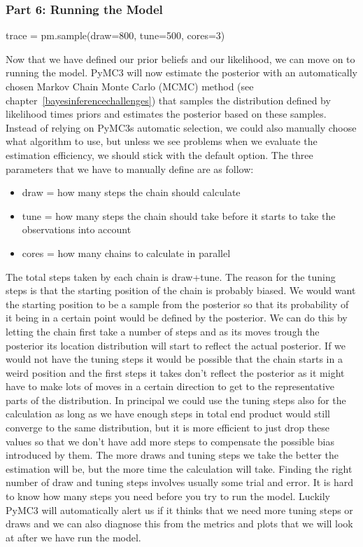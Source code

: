 \documentclass[12pt,a4paper,leqno]{report}
\theoremstyle{plain}
\theoremstyle{definition}
\theoremstyle{remark}
\begin{document}
\subsubsection*{Part 6: Running the Model}

\bigskip
\begin{pyverbatim}[][fontsize=\footnotesize]
    trace = pm.sample(draw=800, tune=500, cores=3)
\end{pyverbatim}
\smallskip

Now that we have defined our prior beliefs and our likelihood, we can move on to running the
model. PyMC3 will now estimate the posterior with an automatically chosen Markov Chain
Monte Carlo (MCMC) method (see chapter\ \ref{bayesinferencechallenges})
that samples the distribution defined by likelihood times priors and estimates the
posterior based on these samples. Instead of relying on PyMC3s automatic selection, we could also manually choose what
algorithm to use, but unless we see problems when we evaluate the estimation efficiency,
we should stick with the default option. The three parameters that we have to manually define are as follow:

\begin{itemize}
    \item[] draw = how many steps the chain should calculate
    \item[] tune = how many steps the chain should take before it starts to
    take the observations into account
    \item[] cores = how many chains to calculate in parallel
\end{itemize}

The total steps taken by each chain is draw+tune. The reason for the tuning steps is
that the starting position of the chain is probably biased. We would want the starting
position to be a sample from the posterior so that its probability of it being in a certain
point would be defined by the posterior. We can do this by letting the chain first take
a number of steps and as its moves trough the posterior its location distribution will start to
reflect the actual posterior. If we would not have the tuning steps it would be possible
that the chain starts in a weird position and the first steps it takes don't reflect the
posterior as it might have to make lots of moves in a certain direction to get to the
representative parts of the distribution. In principal we could use the tuning steps
also for the calculation as long as we have enough steps in total end product would
still converge to the same distribution, but it is more efficient to just drop these
values so that we don't have add more steps to compensate the possible bias introduced by
them. The more draws and tuning steps we take the better the estimation will be, but the
more time the calculation will take. Finding the
right number of draw and tuning steps involves usually some trial and error. It is
hard to know how many steps you need before you try to run the model. Luckily PyMC3 will
automatically alert us if it thinks that we need more tuning steps or draws and we can
also diagnose this from the metrics and plots that we will look at after we have run the
model.
\end{document}
